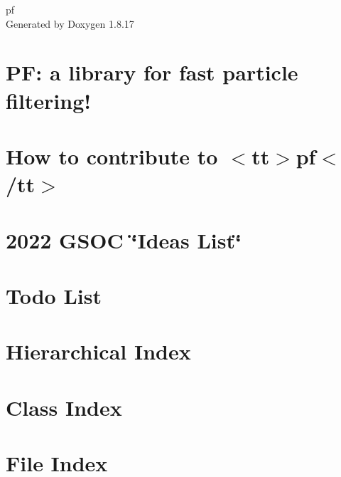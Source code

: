 \let\mypdfximage\pdfximage\def\pdfximage{\immediate\mypdfximage}\documentclass[twoside]{book}
\newcommand{\+}{\discretionary{\mbox{\scriptsize$\hookleftarrow$}}{}{}}
\newcommand{\clearemptydoublepage}{%
  \newpage{\pagestyle{empty}\cleardoublepage}%
}
\begin{document}
\hypersetup{pageanchor=false,
             bookmarksnumbered=true,
             pdfencoding=unicode
            }
\begin{titlepage}
\vspace*{7cm}
\begin{center}%
{\Large pf }\\
\vspace*{1cm}
{\large Generated by Doxygen 1.8.17}\\
\end{center}
\end{titlepage}
\clearemptydoublepage
{}
\tableofcontents
\clearemptydoublepage
{}
\hypersetup{pageanchor=true}

\chapter{PF\+: a library for fast particle filtering!}
\label{index}\hypertarget{index}{}
\chapter{How to contribute to $<$tt$>$pf$<$/tt$>$}
\label{md_CONTRIBUTING}

\chapter{2022 G\+S\+OC \char`\"{}\+Ideas List\char`\"{}}
\label{md_ideas_list}

\chapter{Todo List}
\label{todo}

\chapter{Hierarchical Index}

\chapter{Class Index}

\chapter{File Index}

\end{document}
